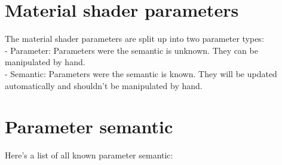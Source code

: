 \section{Material shader parameters}
The material shader parameters are split up into two parameter types:\\
- Parameter: Parameters were the semantic is unknown.
             They can be manipulated by hand.\\
- Semantic:  Parameters were the semantic is known.
             They will be updated automatically and shouldn't be manipulated
             by hand.\\




\section{Parameter semantic}
Here's a list of all known parameter semantic:\\

